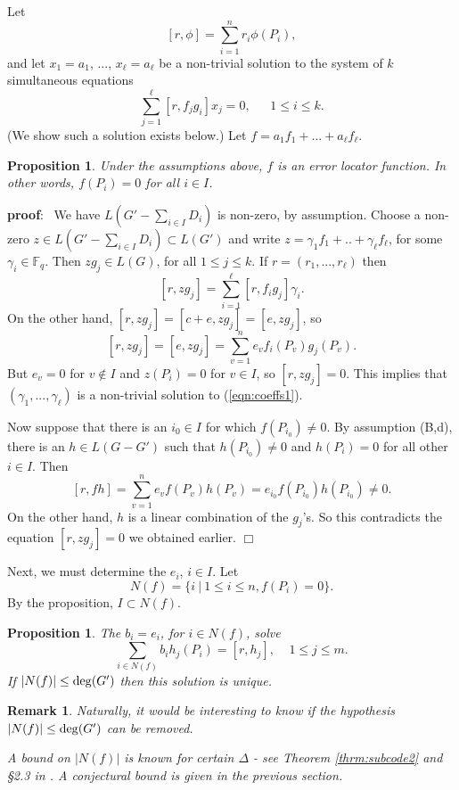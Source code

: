 \documentclass[12pt]{article}
\newtheorem{proposition}[theorem]{Proposition}
\newtheorem{remark}[theorem]{Remark}
\def\pf{{\bf proof}:\ }
\def\qed{$\Box$}
\def\fff{\mathbb{F}}
\begin{document}
Let
\[
[r,\phi ]=\sum_{i=1}^n r_i\phi (P_i),
\]
and let $x_1=a_1$, ..., $x_\ell=a_\ell$ be a non-trivial solution 
to the system of $k$ simultaneous equations
\begin{equation}
\label{eqn:coeffs1}
\sum_{j=1}^\ell [r,f_jg_i]x_j=0,
\ \ \ \ \ \ \ 1\leq i\leq k.
\end{equation} 
(We show such a solution exists below.)
Let $f=a_1f_1+...+a_\ell f_\ell$.

\begin{proposition}
\label{prop:errorlocator}
Under the assumptions above, 
$f$ is an error locator function. In other words,
$f(P_i)=0$ for all $i\in I$.
\end{proposition}

\pf
We have $L(G'-\sum_{i\in I}D_i)$ is non-zero, by assumption.
Choose a non-zero $z\in L(G'-\sum_{i\in I}D_i)\subset L(G')$
and write $z=\gamma_1f_1+..+\gamma_\ell f_\ell$, for some
$\gamma_i\in \fff_q$. Then $zg_j\in L(G)$, for all
$1\leq j\leq k$. If $r=(r_1,...,r_\ell)$ then 
\[
[r,zg_j]=\sum_{i=1}^\ell [r,f_ig_j]\gamma_i.
\]
On the other hand, $[r,zg_j]=[c+e,zg_j]=[e,zg_j]$, so
\[
[r,zg_j]=[e,zg_j]
= \sum_{v=1}^n e_v f_i(P_v)g_j(P_v).
\]
But $e_v=0$ for $v\notin I$ and $z(P_i)=0$ for
$v\in I$, so $[r,zg_j]=0$. This implies that
$(\gamma_1,...,\gamma_\ell)$ is a non-trivial solution to 
(\ref{eqn:coeffs1}).

Now suppose that there is an $i_0\in I$ for which 
$f(P_{i_0})\not= 0$. By assumption (B,d),
there is an $h\in L(G-G')$ such that
$h(P_{i_0})\not= 0$ and $h(P_i)=0$ for all
other $i\in I$. Then
\[
[r,fh]=\sum_{v=1}^n e_v f(P_v)h(P_v)
=e_{i_0}f(P_{i_0})h(P_{i_0})\not= 0.
\]
On the other hand, $h$ is a linear combination 
of the $g_j$'s. So this contradicts the 
equation $[r,zg_j]=0$ we obtained earlier.
\qed

Next, we must determine the $e_i$, $i\in I$.
Let 
\[
N(f)=\{i \ |\ 1\leq i\leq n, f(P_i)=0\}.
\]
By the proposition, $I\subset N(f)$. 

\begin{proposition}
\label{prop:errors}
The $b_i=e_i$, for $i\in N(f)$, solve 
\[
\sum_{i\in N(f)} b_i h_j(P_i)=[r,h_j],\ \ \ \ \ 1\leq j\leq m.
\]
If $|N(f)|\leq {\rm deg}(G')$ then this solution is unique.
\end{proposition}

\begin{remark}
Naturally, it would be interesting to know if
the hypothesis $|N(f)|\leq {\rm deg}(G')$ can be removed.

A bound on $|N(f)|$ is known for certain $\Delta$ - 
see Theorem \ref{thrm:subcode2} and
\S 2.3 in \cite{H3}. A conjectural bound is given in the
previous section.
\end{remark}
\end{document}
